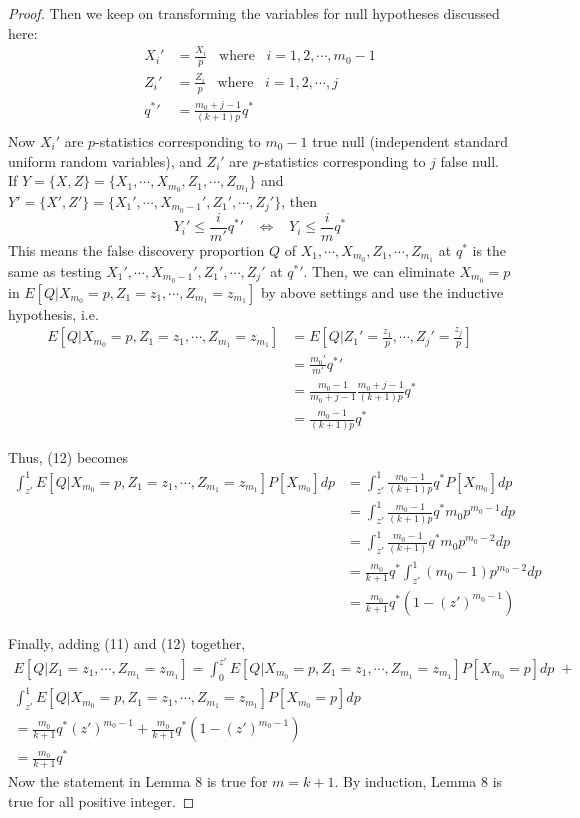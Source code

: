 \documentclass[12pt]{article}
\theoremstyle{plain}
\theoremstyle{definition}
\theoremstyle{remark}
\begin{document}
\begin{proof}
Then we keep on transforming the variables for null hypotheses discussed here:
\begin{equation*}
    \begin{split}
    X_i' &= \frac{X_i}{p}\;\;\; \text{where} \;\;\;i ={1,2,\cdots,m_0-1} \\
    Z_i' &= \frac{Z_i}{p}\;\;\; \text{where}\;\;\; i ={1,2,\cdots,j} \\
    {q^*}'&=\frac{m_0+j-1}{(k+1)p}q^*\\
    \end{split}
\end{equation*}
Now $X_i'$ are $p$-statistics corresponding to $m_0-1$ true null (independent standard uniform random variables), and $Z_i'$ are $p$-statistics corresponding to $j$ false null. If $Y=\{X,Z\}=\{X_1,\cdots,X_{m_0},Z_1,\cdots,Z_{m_1}\}$ and $Y'=\{X',Z'\}=\{X_1',\cdots,X_{m_0-1}',Z_1',\cdots,Z_{j}'\}$, then \[Y_i'\leq \frac{i}{m'}{q^*}'\;\;\;\iff\;\;\;Y_i\leq \frac{i}{m}q^*
\]
This means the false discovery proportion $Q$ of $X_1,\cdots,X_{m_0},Z_1,\cdots,Z_{m_1}$ at $q^*$ is the same as testing $X_1',\cdots,X_{m_0-1}',Z_1',\cdots,Z_{j}'$ at ${q^*}'$. Then, we can eliminate $X_{m_0}=p$ in  $E[Q|X_{m_0}=p,Z_1=z_1,\cdots,Z_{m_1}=z_{m_1}]$ by above settings and use the inductive hypothesis, i.e.
\begin{align*}
    E[Q|X_{m_0}=p,Z_1=z_1,\cdots,Z_{m_1}=z_{m_1}] 
    &=E\left[Q|Z_1'=\frac{z_1}{p},\cdots,Z_{j}'=\frac{z_j}{p}\right]\\
    &=\frac{m_0'}{m'}{q^*}'\\
    &=\frac{m_0-1}{m_0+j-1}\frac{m_0+j-1}{(k+1)p}q^*\\
    &=\frac{m_0-1}{(k+1)p}q^*
\end{align*}

Thus, (12) becomes
\begin{align*}
\int_{z'}^1E[Q|X_{m_0}=p,Z_1=z_1,\cdots,Z_{m_1}=z_{m_1}]P[X_{m_0}]dp 
&= \int_{z'}^1 \frac{m_0-1}{(k+1)p}q^*P[X_{m_0}]dp\\
&=\int_{z'}^1 \frac{m_0-1}{(k+1)p}q^*m_0p^{m_0-1}dp\\
&=\int_{z'}^1 \frac{m_0-1}{(k+1)}q^*m_0p^{m_0-2}dp\\
&=\frac{m_0}{k+1}q^*\int_{z'}^1(m_0-1)p^{m_0-2}dp\\
&=\frac{m_0}{k+1}q^*(1-(z')^{m_0-1})
\end{align*}

Finally, adding (11) and (12) together,
\begin{gather*}
    E[Q|Z_1=z_1,\cdots,Z_{m_1}=z_{m_1}]=\int_0^{z'}E[Q|X_{m_0}=p,Z_1=z_1,\cdots,Z_{m_1}=z_{m_1}]P[X_{m_0}=p]dp\;+\\\int_{z'}^1E[Q|X_{m_0}=p,Z_1=z_1,\cdots,Z_{m_1}=z_{m_1}]P[X_{m_0}=p]dp\\ 
    =\frac{m_0}{k+1}q^*(z')^{m_0-1}+\frac{m_0}{k+1}q^*(1-(z')^{m_0-1})\\
    =\frac{m_0}{k+1}q^*
\end{gather*}
Now the statement in Lemma 8 is true for $m=k+1$. By induction, Lemma 8 is true for all positive integer.
\end{proof}
\end{document}
